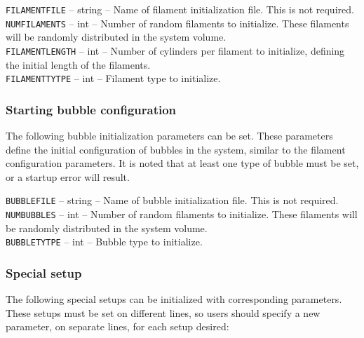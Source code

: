 \documentclass[11pt, oneside]{article}   	%
\begin{document}
\small

  \noindent\texttt{FILAMENTFILE} -- string -- Name of filament initialization file. This is not required.\\

  \noindent\texttt{NUMFILAMENTS} -- int -- Number of random filaments to initialize. These filaments will be randomly 
  distributed in the system volume.\\

  \noindent\texttt{FILAMENTLENGTH} -- int -- Number of cylinders per filament to initialize, defining the initial length of the filaments.\\
  
   \noindent\texttt{FILAMENTTYTPE} -- int -- Filament type to initialize.\\

\normalsize

\subsubsection{Starting bubble configuration}

The following bubble initialization parameters can be set. These parameters define the initial configuration of bubbles in the system, similar to the filament configuration parameters. It is noted that at least one type of bubble must be set, or a startup error will result.\\

\small

  \noindent\texttt{BUBBLEFILE} -- string -- Name of bubble initialization file. This is not required.\\

  \noindent\texttt{NUMBUBBLES} -- int -- Number of random filaments to initialize. These filaments will be randomly 
  distributed in the system volume.\\

   \noindent\texttt{BUBBLETYTPE} -- int -- Bubble type to initialize.\\
   
\normalsize

\subsubsection{Special setup}

The following special setups can be initialized with corresponding parameters. These setups must be set on different lines, so users should specify a new parameter, on separate lines, for each setup desired:\\
\end{document}
